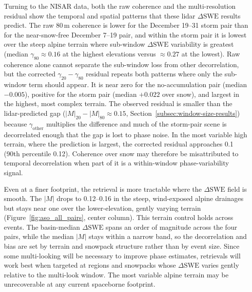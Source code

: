 \documentclass[tc, manuscript]{copernicus}
\begin{document}
Turning to the NISAR data, both the raw coherence and the multi-resolution residual show the temporal and spatial patterns that these lidar $\Delta\mathrm{SWE}$ results predict. The raw 80\,\unit{m} coherence is lower for the December 19--31 storm pair than for the near-snow-free December 7--19 pair, and within the storm pair it is lowest over the steep alpine terrain where sub-window $\Delta\mathrm{SWE}$ variability is greatest (median $\gamma_{80}\approx0.16$ at the highest elevations versus $\approx0.27$ at the lowest). Raw coherence alone cannot separate the sub-window loss from other decorrelation, but the corrected $\gamma_{20}-\gamma_{80}$ residual repeats both patterns where only the sub-window term should appear. It is near zero for the no-accumulation pair (median $-0.005$), positive for the storm pair (median $+0.022$ over snow), and largest in the highest, most complex terrain. The observed residual is smaller than the lidar-predicted gap ($|M|_{20}-|M|_{80}\approx0.15$, Section~\ref{subsec:window-size-results}) because $\gamma_\mathrm{other}$ multiplies the difference and much of the storm-pair scene is decorrelated enough that the gap is lost to phase noise. In the most variable high terrain, where the prediction is largest, the corrected residual approaches 0.1 (90th percentile 0.12). Coherence over snow may therefore be misattributed to temporal decorrelation when part of it is a within-window phase-variability signal.

Even at a finer footprint, the retrieval is more tractable where the $\Delta\mathrm{SWE}$ field is smooth. The $|M|$ drops to 0.12--0.16 in the steep, wind-exposed alpine drainages but stays near one over the lower-elevation, gently varying terrain (Figure~\ref{fig:aso_all_pairs}, center column). This terrain control holds across events. The basin-median $\Delta\mathrm{SWE}$ spans an order of magnitude across the four pairs, while the median $|M|$ stays within a narrow band, so the decorrelation and bias are set by terrain and snowpack structure rather than by event size. Since some multi-looking will be necessary to improve phase estimates, retrievals will work best when targeted at regions and snowpacks whose $\Delta\mathrm{SWE}$ varies gently relative to the multi-look window. The most variable alpine terrain may be unrecoverable at any current spaceborne footprint.
\end{document}
